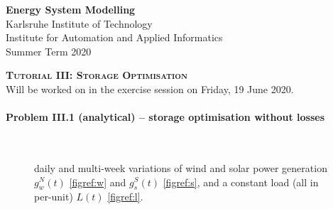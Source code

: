 \documentclass[11pt,a4paper,fleqn]{scrartcl}
\begin{document}
\begin{flushright}
 \textbf{Energy System Modelling }\\
 {\small Karlsruhe Institute of Technology}\\
 {\small Institute for Automation and Applied Informatics}\\
 {\small Summer Term 2020}\\
\end{flushright}

 
 \vspace{-0.5em}
 \hrulefill
 \vspace{0.3em}

\begin{center}
 \textbf{\textsc{\Large Tutorial III: Storage Optimisation}}\\
 \small Will be worked on in the exercise session on Friday, 19 June 2020.\\[1.5em]
\end{center}

\vspace{-0.5em}
\hrulefill
\vspace{0.8em}

\paragraph{Problem III.1 (analytical) -- storage optimisation without losses \faHome}~\\

\begin{wrapfigure}[11]{r}{0pt}
 \caption{daily and multi-week variations of wind and solar power generation
  \(g^{N}_{w}(t)\)
  \autoref{figref:w} and \(g^{S}_{s}(t)\)
  \autoref{figref:s}, and a constant load (all in per-unit) \(L(t)\)
  \autoref{figref:l}.}
 \label{fig:variations}
\end{wrapfigure}
\end{document}
